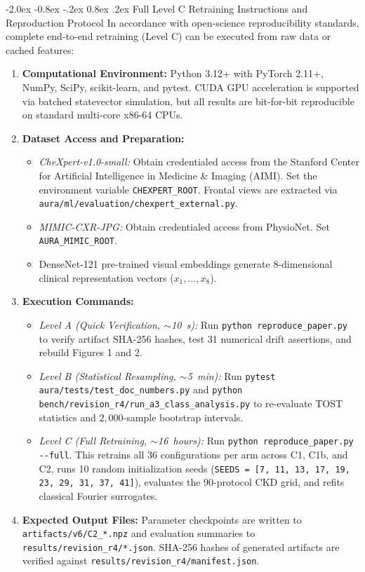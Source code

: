 \documentclass[10pt,a4paper]{article}
\makeatletter
\renewcommand{\subsection}{\@startsection{subsection}{2}{\z@}%
  {-2.0ex \@plus -0.8ex \@minus -.2ex}%
  {0.8ex \@plus.2ex}%
  {\normalfont\large\sffamily\bfseries\color{naturedark}}}
\makeatother
\begin{document}
\subsection{Full Level C Retraining Instructions and Reproduction Protocol}
In accordance with open-science reproducibility standards, complete end-to-end retraining (Level C) can be executed from raw data or cached features:
\begin{enumerate}
  \item \textbf{Computational Environment:} Python 3.12+ with PyTorch 2.11+, NumPy, SciPy, scikit-learn, and pytest. CUDA GPU acceleration is supported via batched statevector simulation, but all results are bit-for-bit reproducible on standard multi-core x86-64 CPUs.
  \item \textbf{Dataset Access and Preparation:}
  \begin{itemize}
    \item \textit{CheXpert-v1.0-small:} Obtain credentialed access from the Stanford Center for Artificial Intelligence in Medicine \& Imaging (AIMI). Set the environment variable \texttt{CHEXPERT\_ROOT}. Frontal views are extracted via \texttt{aura/ml/evaluation/chexpert\_external.py}.
    \item \textit{MIMIC-CXR-JPG:} Obtain credentialed access from PhysioNet. Set \texttt{AURA\_MIMIC\_ROOT}.
    \item DenseNet-121 pre-trained visual embeddings generate 8-dimensional clinical representation vectors ($x_1, \dots, x_8$).
  \end{itemize}
  \item \textbf{Execution Commands:}
  \begin{itemize}
    \item \textit{Level A (Quick Verification, $\sim$10~s):} Run \texttt{python reproduce\_paper.py} to verify artifact SHA-256 hashes, test 31 numerical drift assertions, and rebuild Figures 1 and 2.
    \item \textit{Level B (Statistical Resampling, $\sim$5~min):} Run \texttt{pytest aura/tests/test\_doc\_numbers.py} and \texttt{python bench/revision\_r4/run\_a3\_class\_analysis.py} to re-evaluate TOST statistics and $2{,}000$-sample bootstrap intervals.
    \item \textit{Level C (Full Retraining, $\sim$16~hours):} Run \texttt{python reproduce\_paper.py -{}-full}. This retrains all 36 configurations per arm across C1, C1b, and C2, runs 10 random initialization seeds (\texttt{SEEDS = [7, 11, 13, 17, 19, 23, 29, 31, 37, 41]}), evaluates the 90-protocol CKD grid, and refits classical Fourier surrogates.
  \end{itemize}
  \item \textbf{Expected Output Files:} Parameter checkpoints are written to \texttt{artifacts/v6/C2\_*.npz} and evaluation summaries to \texttt{results/revision\_r4/*.json}. SHA-256 hashes of generated artifacts are verified against \texttt{results/revision\_r4/manifest.json}.
\end{enumerate}
\end{document}
